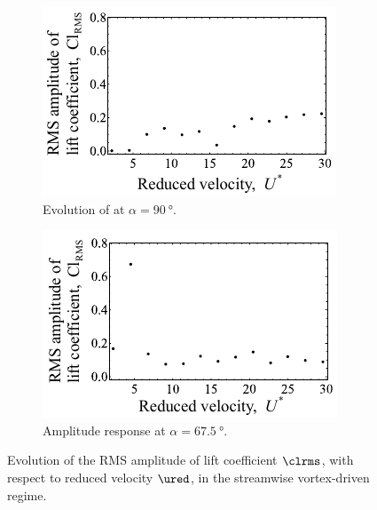 \documentclass[a4paper,fleqn]{cas-sc}
\begin{document}
\begin{figure}
  \centering
  \begin{subfigure}[h]{0.38\textwidth}
    \includegraphics[width=\textwidth]{figs/clRMS5}
    \caption{Evolution of at $\alpha = \SI{90}{\degree}$.}
    \label{fig:clRMS5}
  \end{subfigure}

  \begin{subfigure}[h]{0.38\textwidth}
    \includegraphics[width=\textwidth]{figs/clRMS4}
    \caption{Amplitude response at $\alpha = \SI{67.5}{\degree}$.}
    \label{fig:clRMS4}
  \end{subfigure}
  \caption{Evolution of the RMS amplitude of lift coefficient $\clrms$,  with respect to reduced velocity $\ured$, in the streamwise vortex-driven regime.} \label{fig:clRMSStreamwise}
\end{figure}
\end{document}
